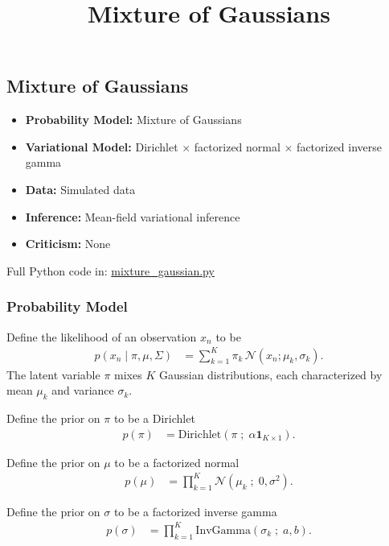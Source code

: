 \title{Mixture of Gaussians}

\subsection{Mixture of Gaussians}

\begin{itemize}
  \item \textbf{Probability Model:} Mixture of Gaussians
  \item \textbf{Variational Model:} Dirichlet $\times$ factorized normal
  $\times$ factorized inverse gamma
  \item \textbf{Data:} Simulated data
  \item \textbf{Inference:} Mean-field variational inference
  \item \textbf{Criticism:} None
\end{itemize}

Full Python code in: 
\href{https://github.com/blei-lab/edward/blob/master/examples/mixture_gaussian.py}
{mixture_gaussian.py}


\subsubsection{Probability Model}
Define the likelihood of an observation $x_n$
to be
\begin{align*}
  p(x_{n} \mid \pi, \mu, \Sigma)
  &=
  \sum_{k=1}^K \pi_k \, \mathcal{N}(x_n ; \mu_k, \sigma_k).
\end{align*}
The latent variable $\pi$ mixes $K$ Gaussian distributions, each 
characterized by mean $\mu_k$ and variance $\sigma_k$.

Define the prior on $\pi$ to be a Dirichlet 
\begin{align*}
  p(\pi)
  &=
  \text{Dirichlet}(\pi \;;\; \alpha \mathbf{1}_{K \times 1}).
\end{align*} 

Define the prior on $\mu$ to be a factorized normal 
\begin{align*}
  p(\mu)
  &=
  \prod_{k=1}^{K} \mathcal{N}(\mu_k \;;\; 0, \sigma^2).
\end{align*} 

Define the prior on $\sigma$ to be a factorized inverse gamma
\begin{align*}
  p(\sigma)
  &=
  \prod_{k=1}^{K} \text{InvGamma}(\sigma_k \;;\; a, b).
\end{align*} 

